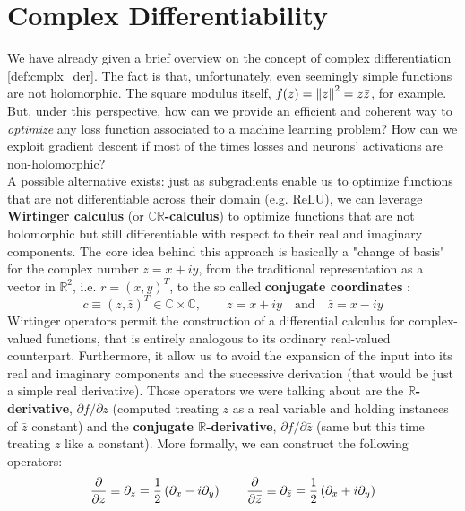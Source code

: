 \documentclass[../main.tex]{subfiles}
\begin{document}
\section{Complex Differentiability}
\label{sec:cmplx_differentiability}

We have already given a brief overview on the concept of complex differentiation \ref{def:cmplx_der}. The fact is that, unfortunately, even seemingly simple functions are not holomorphic. The square modulus itself, $f(z) = \norm{z}^2 = z\bar{z}$, for example.\\
But, under this perspective, how can we provide an efficient and coherent way to \textit{optimize} any loss function associated to a machine learning problem? How can we exploit gradient descent if most of the times losses and neurons' activations are non-holomorphic?\\
A possible alternative exists: just as subgradients enable us to optimize functions that are not differentiable across their domain (e.g. ReLU), we can leverage \textbf{Wirtinger calculus} (or \textbf{$\mathds{CR}$-calculus}) to optimize functions that are not holomorphic
but still differentiable with respect to their real and imaginary components. The core idea behind this approach is basically a "change of basis" for the complex number $z=x+iy$, from the traditional representation as a vector in $\mathds{R}^2$, i.e. $r=(x,y)^T$, to the so called \textbf{conjugate coordinates} \cite{kreutzdelgado2009complex}:
\begin{equation}
	c \equiv \left(z, \bar{z}\right)^T \in \mathds{C}\times\mathds{C}, \qquad z=x+iy \quad\text{and}\quad \bar{z}=x-iy
\end{equation}
Wirtinger operators permit the construction of a differential calculus for complex-valued functions, that is entirely analogous to its ordinary real-valued counterpart. Furthermore, it allow us to avoid the expansion of the input into its real and imaginary components and the successive derivation (that would be just a simple real derivative). Those operators we were talking about are the \textbf{$\mathds{R}$-derivative}, $\partial f/\partial z$ (computed treating $z$ as a real variable and holding instances of $\bar{z}$ constant) and the \textbf{conjugate $\mathds{R}$-derivative}, $\partial f/\partial\bar{z}$ (same but this time treating $z$ like a constant). More formally, we can construct the following operators:
\begin{equation}
\pdv{}{z} \equiv \partial_z = \frac{1}{2}\left(\partial_x - i\partial_y\right) \qquad  \pdv{}{\bar{z}} \equiv \partial_{\bar{z}} = \frac{1}{2}\left(\partial_x + i\partial_y\right)
\label{eq:CR_derivs}
\end{equation}
\end{document}
